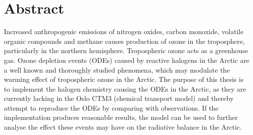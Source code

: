 \chapter*{Abstract}



Increased anthropogenic emissions of nitrogen oxides, carbon monoxide, volatile organic compounds and methane causes production of ozone in the troposphere, particularly in the northern hemisphere. Tropospheric ozone acts as a greenhouse gas. Ozone depletion events (ODEs) caused by reactive halogens in the Arctic are a well known and thoroughly studied phenomena, which may modulate the warming effect of tropospheric ozone in the Arctic. The purpose of this thesis is to implement the halogen chemistry causing the ODEs in the Arctic, as they are currently lacking in the Oslo CTM3 (chemical transport model) and thereby attempt to reproduce the ODEs by comparing with observations. If the implementation produces reasonable results, the model can be used to further analyse the effect these events may have on the radiative balance in the Arctic. 
\cleardoublepage


